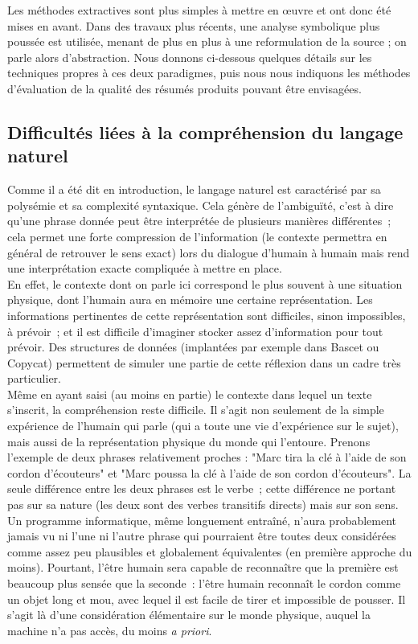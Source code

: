\documentclass[a4paper, 12pt]{article}
\begin{document}
Les méthodes extractives sont plus simples à mettre en \oe{}uvre et ont donc été mises en avant. Dans des travaux plus récents, une analyse symbolique plus poussée est utilisée, menant de plus en plus à une reformulation de la source ; on parle alors d'abstraction. Nous donnons ci-dessous quelques détails sur les techniques propres à ces deux paradigmes, puis nous nous indiquons les méthodes d'évaluation de la qualité des résumés produits pouvant être envisagées.

\subsection{Difficultés liées à la compréhension du langage naturel}

Comme il a été dit en introduction, le langage naturel est caractérisé par sa polysémie et sa complexité syntaxique. Cela génère de l'ambiguïté, c'est à dire qu'une phrase donnée peut être interprétée de plusieurs manières différentes~; cela permet une forte compression de l'information (le contexte permettra en général de retrouver le sens exact) lors du dialogue d'humain à humain mais rend une interprétation exacte compliquée à mettre en place.\\

En effet, le contexte dont on parle ici correspond le plus souvent à une situation physique, dont l'humain aura en mémoire une certaine représentation. Les informations pertinentes de cette représentation sont difficiles, sinon impossibles, à prévoir~; et il est difficile d'imaginer stocker assez d'information pour tout prévoir. Des structures de données (implantées par exemple dans Bascet ou Copycat) permettent de simuler une partie de cette réflexion dans un cadre très particulier.\\

Même en ayant saisi (au moins en partie) le contexte dans lequel un texte s'inscrit, la compréhension reste difficile. Il s'agit non seulement de la simple expérience de l'humain qui parle (qui a toute une vie d'expérience sur le sujet), mais aussi de la représentation physique du monde qui l'entoure. Prenons l'exemple de deux phrases relativement proches : "Marc tira la clé à l'aide de son cordon d'écouteurs" et "Marc poussa la clé à l'aide de son cordon d'écouteurs". La seule différence entre les deux phrases est le verbe~; cette différence ne portant pas sur sa nature (les deux sont des verbes transitifs directs) mais sur son sens. Un programme informatique, même longuement entraîné, n'aura probablement jamais vu ni l'une ni l'autre phrase qui pourraient être toutes deux considérées comme assez peu plausibles et globalement équivalentes (en première approche du moins). Pourtant, l'être humain sera capable de reconnaître que la première est beaucoup plus sensée que la seconde~: l'être humain reconnaît le cordon comme un objet long et mou, avec lequel il est facile de tirer et impossible de pousser. Il s'agit là d'une considération élémentaire sur le monde physique, auquel la machine n'a pas accès, du moins \emph{a priori}.\\
\end{document}
